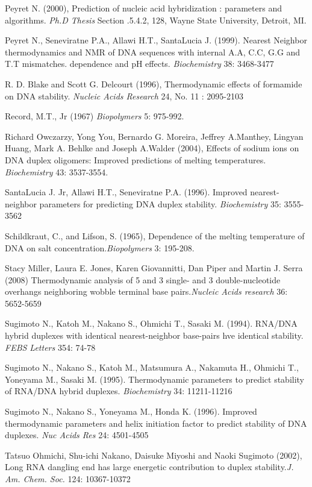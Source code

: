 \documentclass{article}
\begin{document}
Peyret N. (2000), Prediction of nucleic acid hybridization : parameters and algorithms.
\textit{Ph.D Thesis} Section .5.4.2, 128, Wayne State University, Detroit, MI.

Peyret N., Seneviratne P.A., Allawi H.T., SantaLucia J. (1999). Nearest Neighbor thermodynamics and 
NMR of DNA sequences with internal A.A, C.C, G.G and T.T mismatches. dependence and pH effects.
\textit{Biochemistry} 38: 3468-3477

R. D. Blake and Scott G. Delcourt (1996), Thermodynamic effects of formamide on DNA stability.
\textit{Nucleic Acids Research} 24, No. 11 : 2095-2103

Record, M.T., Jr (1967) \textit{Biopolymers} 5: 975-992.

Richard Owczarzy, Yong You, Bernardo G. Moreira, Jeffrey A.Manthey, Lingyan Huang, Mark A. 
Behlke and Joseph A.Walder (2004), Effects of sodium ions on DNA duplex oligomers: Improved 
predictions of melting temperatures. \textit{Biochemistry} 43: 3537-3554.

  SantaLucia J. Jr, Allawi H.T., Seneviratne P.A. (1996). Improved 
nearest-neighbor parameters for predicting DNA duplex stability. \textit{Biochemistry} 
35: 3555-3562  

Schildkraut, C., and Lifson, S. (1965), Dependence of the melting temperature of DNA on 
salt concentration.\textit{Biopolymers} 3: 195-208.

Stacy Miller, Laura E. Jones, Karen Giovannitti, Dan Piper and Martin J. Serra (2008)
Thermodynamic analysis of 5 and 3 single- and 3 double-nucleotide overhangs 
neighboring wobble terminal base pairs.\textit{Nucleic Acids research}  36: 5652-5659  

  Sugimoto N., Katoh M., Nakano S., Ohmichi T., Sasaki M. (1994). 
RNA/DNA hybrid duplexes with identical nearest-neighbor base-pairs hve identical 
stability. \textit{FEBS Letters} 354: 74-78   

  Sugimoto N., Nakano S., Katoh M., Matsumura 
A., Nakamuta H., Ohmichi T., Yoneyama M., Sasaki M. (1995). Thermodynamic parameters 
to predict stability of RNA/DNA hybrid duplexes. \textit{Biochemistry} 34: 11211-11216 
  
  Sugimoto N., Nakano S., Yoneyama M., Honda K. (1996).  Improved thermodynamic 
parameters and helix initiation factor to predict stability of DNA duplexes. 
\textit{Nuc Acids Res}  24: 4501-4505  

Tatsuo Ohmichi, Shu-ichi Nakano, Daisuke Miyoshi and Naoki Sugimoto (2002), Long RNA dangling
end has large energetic contribution to duplex stability.\textit{J. Am. Chem. Soc.}
124: 10367-10372
\end{document}
